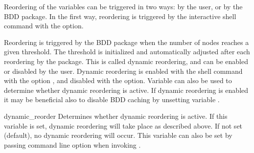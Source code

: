 Reordering of the variables can be triggered in two ways: by the user,
or by the BDD package.  In the first way, reordering is triggered by
the interactive shell command  with the
 option.

Reordering is triggered by the BDD package when the number of nodes
reaches a given threshold. The threshold is initialized and
automatically adjusted after each reordering by the package.  This is
called dynamic reordering, and can be enabled or disabled by the
user.  Dynamic reordering is enabled with the shell command
 with the option , and disabled
with the  option. Variable  can also be used
to determine whether dynamic reordering is active.
%
If dynamic reordering is enabled it may be beneficial also to disable
BDD caching by unsetting variable .

\begin{nusmvVar} {dynamic\_reorder}{}{}
Determines whether dynamic reordering is active. If this variable is
set, dynamic reordering will take place as described above. If not set
(default), no dynamic reordering will occur. This variable can also be
set by passing  command line option when invoking
\nusmv.
\end{nusmvVar}

